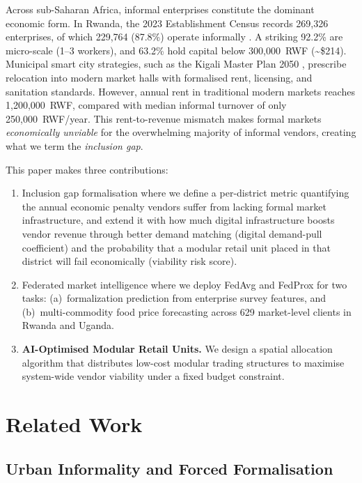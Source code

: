 \documentclass{article}
\begin{document}
Across sub-Saharan Africa, informal enterprises constitute the dominant economic form.
In Rwanda, the 2023 Establishment Census records 269,326 enterprises, of which 229,764 (87.8\%) operate informally \cite{nisr2023ec}.
A striking 92.2\% are micro-scale (1--3 workers), and 63.2\% hold capital below 300,000~RWF (\textasciitilde\$214).
Municipal smart city strategies, such as the Kigali Master Plan 2050 \cite{kigali2019master}, prescribe relocation into modern market halls with formalised rent, licensing, and sanitation standards.
However, annual rent in traditional modern markets reaches 1,200,000~RWF, compared with median informal turnover of only 250,000~RWF/year.
This rent-to-revenue mismatch makes formal markets \emph{economically unviable} for the overwhelming majority of informal vendors, creating what we term the \emph{inclusion gap}.

This paper makes three contributions:
\begin{enumerate}[label=\alph*)]
    \item Inclusion gap formalisation where we define a per-district metric quantifying the annual economic penalty vendors suffer from lacking formal market infrastructure, and extend it with how much digital infrastructure boosts vendor revenue through better demand matching (digital demand-pull coefficient) and the probability that a modular retail unit placed in that district will fail economically (viability risk score).
    \item Federated market intelligence where we deploy FedAvg \cite{mcmahan2017communication} and FedProx \cite{li2020federated} for two tasks: (a)~formalization prediction from enterprise survey features, and (b)~multi-commodity food price forecasting across 629 market-level clients in Rwanda and Uganda.
    \item \textbf{AI-Optimised Modular Retail Units.} We design a spatial allocation algorithm that distributes low-cost modular trading structures to maximise system-wide vendor viability under a fixed budget constraint.
\end{enumerate}

\section{Related Work}
\label{sec:background}

\subsection{Urban Informality and Forced Formalisation}
\end{document}
